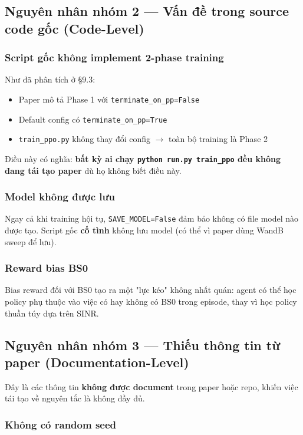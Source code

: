 \documentclass[11pt]{article}
\begin{document}
\subsection{Nguyên nhân nhóm 2 --- Vấn đề trong source code gốc (Code-Level)}

\subsubsection{Script gốc không implement 2-phase training}

Như đã phân tích ở \S9.3:
\begin{itemize}
  \item Paper mô tả Phase 1 với \texttt{terminate\_on\_pp=False}
  \item Default config có \texttt{terminate\_on\_pp=True}
  \item \texttt{train\_ppo.py} không thay đổi config $\to$ toàn bộ training là Phase 2
\end{itemize}

Điều này có nghĩa: \textbf{bất kỳ ai chạy \texttt{python run.py train\_ppo} đều không đang tái tạo paper} dù họ không biết điều này.

\subsubsection{Model không được lưu}

Ngay cả khi training hội tụ, \texttt{SAVE\_MODEL=False} đảm bảo không có file model nào được tạo. Script gốc \textbf{cố tình} không lưu model (có thể vì paper dùng WandB sweep để lưu).

\subsubsection{Reward bias BS0}

Bias reward đối với BS0 tạo ra một "lực kéo" không nhất quán: agent có thể học policy phụ thuộc vào việc có hay không có BS0 trong episode, thay vì học policy thuần túy dựa trên SINR.

\subsection{Nguyên nhân nhóm 3 --- Thiếu thông tin từ paper (Documentation-Level)}

Đây là các thông tin \textbf{không được document} trong paper hoặc repo, khiến việc tái tạo về nguyên tắc là không đầy đủ.

\subsubsection{Không có random seed}
\end{document}
